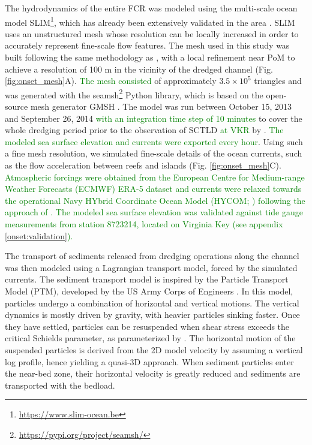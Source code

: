 \documentclass[preprint,12pt,authoryear]{elsarticle}
\newcommand{\modif}[1]{\textcolor{green}{#1}}
\begin{document}
The hydrodynamics of the entire FCR was modeled using the multi-scale ocean model SLIM\footnote{\url{ https://www.slim-ocean.be}}, which has already been extensively validated in the area \citep{frys2020fine,dobbelaere2020coupled,dobbelaere2022impacts,dobbelaere2022connecting}. SLIM uses an unstructured mesh whose resolution can be locally increased in order to accurately represent fine-scale flow features. The mesh used in this study was built following the same methodology as \cite{dobbelaere2020coupled}, with a local refinement near PoM to achieve a resolution of 100 m in the vicinity of the dredged channel (Fig. \ref{fig:onset_mesh}A). \modif{The mesh consisted} of approximately $3.5\times 10^5$ triangles and was generated with the seamsh\footnote{\url{https://pypi.org/project/seamsh/}} Python library, which is based on the open-source mesh generator GMSH \citep{geuzaine2009gmsh}. The model was run between October 15, 2013 and September 26, 2014 \modif{with an integration time step of 10 minutes} to cover the whole dredging period prior to the observation of SCTLD \modif{at VKR} by \cite{precht2016unprecedented}. \modif{The modeled sea surface elevation and currents were exported every hour}. Using such a fine mesh resolution, we simulated fine-scale details of the ocean currents, such as the flow acceleration between reefs and islands (Fig. \ref{fig:onset_mesh}C). \modif{Atmospheric forcings were obtained from the European Centre for Medium-range Weather Forecasts (ECMWF) ERA-5 dataset and currents were relaxed towards the operational Navy HYbrid Coordinate Ocean Model (HYCOM; \citealp{chassignet2007hycom}) following the approach of \cite{dobbelaere2022impacts}. The modeled sea surface elevation was validated against tide gauge measurements from station 8723214, located on Virginia Key (see appendix \ref{onset:validation}).}

The transport of sediments released from dredging operations along the channel was then modeled using a Lagrangian transport model, forced by the simulated currents. The sediment transport model is inspired by the Particle Transport Model (PTM), developed by the US Army Corps of Engineers \citep{macdonald2006ptm}. In this model, particles undergo a combination of horizontal and vertical motions. The vertical dynamics is mostly driven by gravity, with heavier particles sinking faster. Once they have settled, particles can be resuspended when shear stress exceeds   the critical Schields parameter, as parameterized by \cite{soulsby1997threshold}. The horizontal motion of the suspended particles is derived from the 2D model velocity by assuming a vertical log profile, hence yielding a quasi-3D approach. When sediment particles enter the near-bed zone, their horizontal velocity is greatly reduced and sediments are transported with the bedload.   
\end{document}

